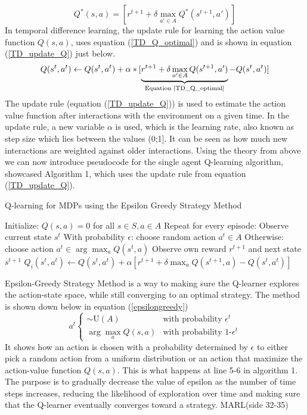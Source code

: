 \documentclass{article}
\begin{document}
\begin{equation}
    \label{TD_Q_optimal}
        Q^*(s,a)= [r^{t+1}+\delta \max_{a'\in A}Q^*(s^{t+1},a')]
\end{equation}
In temporal difference learning, the update rule for learning the action value function $Q(s,a)$, uses equation (\ref{TD_Q_optimal}) and is shown in equation (\ref{TD_update_Q}) just below. 
\begin{equation}
    \label{TD_update_Q}
    Q(s^t,a^t)\leftarrow Q(s^t,a^t)+\alpha *[\underbrace{ r^{t+1}+\delta \max_{a'\in A} Q(s^{t+1},a')}_{\text{Equation \ref{TD_Q_optimal}}}-Q(s^t,a^t)]
\end{equation}
The update rule (equation (\ref{TD_update_Q})) is used to estimate the action value function after interactions with the environment on a given time. 
In the update rule, a new variable $\alpha$ is used, which is the learning rate, also known as step size which lies between the values (0;1]. It can be seen as how much new interactions are weighted against older interactions. Using the theory from above we can now introduce pseudocode for the single agent Q-learning algorithm, showcased Algorithm 1, which uses the update rule from equation (\ref{TD_update_Q}).
\begin{algorithm}[H]
\caption{Q-learning for MDPs using the Epsilon Greedy Strategy Method}
\begin{algorithmic}[1]
\State Initialize: \( Q(s, a) = 0 \) for all \( s \in S, a \in A \)
\State Repeat for every episode:
    \State Observe current state \( s^t \)
    \State With probability \( \epsilon \): choose random action \( a^t \in A \)
    \State Otherwise: choose action \( a^t \in \arg \max_{a} Q(s^t, a) \)
    \State Observe own reward \( r^{t+1} \) and next state \( s^{t+1} \)
    \State \( Q_i(s^t, a^t) \gets Q(s^t, a^t) + \alpha [r^{t+1} + \delta \max_{a} Q(s^{t+1}, a) - Q(s^t, a^t)] \)
\EndFor
\end{algorithmic}
\end{algorithm}
Epsilon-Greedy Strategy Method is a way to making sure the Q-learner explores the action-state space, while still converging to an optimal strategy. The method is shown down below in equation (\ref{epsilongreedy}) 
\begin{equation}
    \label{epsilongreedy}
    a^t\begin{cases}
        \sim\text{U}(A)& \text{with probability $\epsilon^t$}\\
        \arg \max_a Q(s,a) & \text{with probability 1-$\epsilon^t$}
    \end{cases}
\end{equation}
It shows how an action is chosen with a probability determined by $\epsilon$ to either pick a random action from a uniform distribution or an action that maximize the action-value function $Q(s,a)$. This is what happens at line 5-6 in algorithm 1. 
The purpose is to gradually decrease the value of epsilon as the number of time steps increases, reducing the likelihood of exploration over time and making sure that the Q-learner eventually converges toward a strategy.
MARL(side 32-35)
\end{document}
